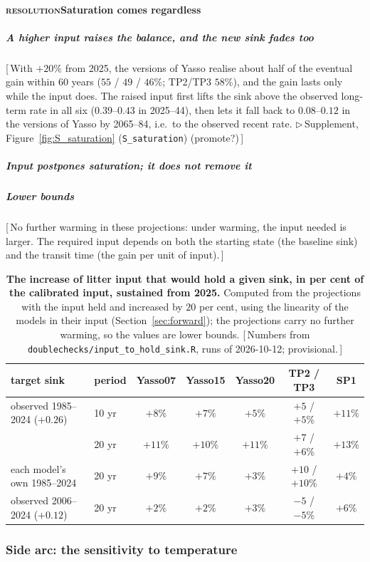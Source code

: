\documentclass[11pt]{article}
\newcounter{subsubparagraph}[subparagraph]
\newcommand{\beat}[1]{\textcolor{black!45}{\textsc{\small #1}}\enspace}
\newcommand{\gap}[1]{\textcolor{red!70!black}{\small[\,#1\,]}}
\newcommand{\suppanchor}[2]{\textcolor{red!70!black}{\small$\triangleright$\,Supplement,
  Figure~\ref{fig:#1} (\texttt{#2})}}
\begin{document}
\paragraph{\beat{resolution}Saturation comes regardless}
\subparagraph{A higher input raises the balance, and the new sink fades too}
\gap{With $+20\%$ from 2025, the versions of Yasso realise about half of the eventual gain within
60 years ($55$ / $49$ / $46\%$; TP2/TP3 $58\%$), and the gain lasts only while the input does. The
raised input first lifts the sink above the observed long-term rate in all six ($0.39$--$0.43$ in
2025--44), then lets it fall back to $0.08$--$0.12$ in the versions of Yasso by 2065--84, i.e.\ to
the observed recent rate.
\suppanchor{S_saturation}{S\_saturation} (promote?)}
\subparagraph{Input postpones saturation; it does not remove it}
\subparagraph{Lower bounds}
\gap{No further warming in these projections: under warming, the input needed is larger. The
required input depends on both the starting state (the baseline sink) and the transit time (the
gain per unit of input).}

\begin{table}[htbp]\centering\small
\caption{\textbf{The increase of litter input that would hold a given sink, in per cent of the
calibrated input, sustained from 2025.} Computed from the projections with the input held and
increased by $20$ per cent, using the linearity of the models in their input (Section~\ref{sec:forward});
the projections carry no further warming, so the values are lower bounds. \gap{Numbers from
\texttt{doublechecks/input\_to\_hold\_sink.R}, runs of 2026-10-12; provisional.}}
\label{tab:input_hold}
\begin{tabular}{llccccc}
\hline
target sink & period & Yasso07 & Yasso15 & Yasso20 & TP2 / TP3 & SP1 \\
\hline
observed 1985--2024 ($+0.26$) & 10 yr & $+8\%$ & $+7\%$ & $+5\%$ & $+5$ / $+5\%$ & $+11\%$ \\
 & 20 yr & $+11\%$ & $+10\%$ & $+11\%$ & $+7$ / $+6\%$ & $+13\%$ \\
each model's own 1985--2024 & 20 yr & $+9\%$ & $+7\%$ & $+3\%$ & $+10$ / $+10\%$ & $+4\%$ \\
observed 2006--2024 ($+0.12$) & 20 yr & $+2\%$ & $+2\%$ & $+3\%$ & $-5$ / $-5\%$ & $+6\%$ \\
\hline
\end{tabular}
\end{table}

\subsubsection{Side arc: the sensitivity to temperature}
\end{document}
